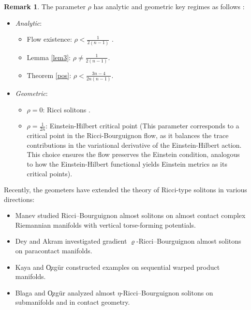 \documentclass[a4paper, twoside, 10pt]{article}
\numberwithin{equation}{section}
\theoremstyle{definition}
\newtheorem{remark}{Remark}[section]
\begin{document}
\begin{remark}\label{rho-remark}
The parameter $\rho$ has analytic and geometric key regimes as follows :
\begin{itemize}
    \item[\bf (A)] \textit{Analytic}:
    \begin{itemize}
        \item Flow existence: $\rho < \frac{1}{2(n-1)}$ \cite{CCD17}.
        \item Lemma \ref{lem3}: $\rho \neq \frac{1}{2(n-1)}$.
        \item Theorem \ref{pos}: $\rho < \frac{3n-4}{2n(n-1)}$.
    \end{itemize}
    \item[\bf (B)] \textit{Geometric}:
    \begin{itemize}
        \item $\rho=0$: Ricci solitons \cite{pigola2011ricci}.
        \item $\rho=\frac{1}{2n}$: Einstein-Hilbert critical point  (This parameter corresponds to a critical point in the Ricci-Bourguignon flow, as it balances the trace contributions in the variational derivative of the Einstein-Hilbert action. This choice ensures the flow preserves the Einstein condition, analogous to how the Einstein-Hilbert functional yields Einstein metrics as its critical points).
        \end{itemize}
\end{itemize}
\end{remark} 







Recently, the geometers have extended the theory of Ricci-type solitons in various directions:
\begin{itemize}
    \item Manev \cite{manevalmost2025} studied Ricci--Bourguignon almost solitons on almost contact complex Riemannian manifolds with vertical torse-forming potentials.
    \item Dey and Akram \cite{dey2024} investigated gradient $\varrho$-Ricci--Bourguignon almost solitons on paracontact manifolds.
    \item Kaya and \c{O}zg\"{u}r \cite{kaya2024} constructed examples on sequential warped product manifolds.
    \item Blaga and \c{O}zg\"{u}r \cite{blaga2022eta, blaga2022sub, blaga2024riemann} analyzed almost $\eta$-Ricci--Bourguignon solitons on submanifolds and in contact geometry.
\end{itemize}
\end{document}
